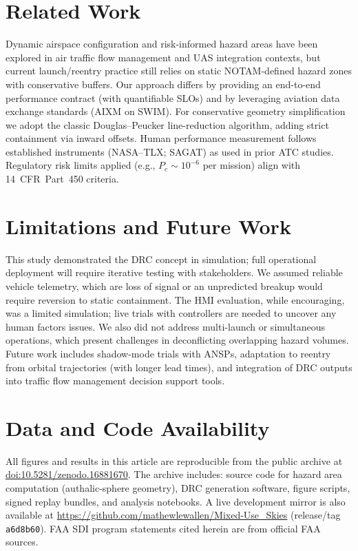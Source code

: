 \documentclass[journal]{new-aiaa}
\newcommand{\DRC}{\textsc{DRC}}
\newcommand{\AIXM}{\textsc{AIXM}}
\newcommand{\SWIM}{\textsc{SWIM}}
\newcommand{\repoURL}{https://github.com/mathewlewallen/Mixed-Use_Skies}
\newcommand{\repoCommit}{a6d8b60}
\newcommand{\repoDOI}{10.5281/zenodo.16881670}
\begin{document}
\section{Related Work}
Dynamic airspace configuration and risk-informed hazard areas have been explored in air traffic flow management and UAS integration contexts, but current launch/reentry practice still relies on static NOTAM-defined hazard zones with conservative buffers.\cite{CRS2019} Our approach differs by providing an end-to-end performance contract (with quantifiable SLOs) and by leveraging aviation data exchange standards (\AIXM{} on \SWIM{}). For conservative geometry simplification we adopt the classic Douglas–Peucker line-reduction algorithm,\cite{DouglasPeucker} adding strict containment via inward offsets. Human performance measurement follows established instruments (NASA--TLX; SAGAT) as used in prior ATC studies.\cite{NASA_TLX,Endsley_SAGAT} Regulatory risk limits applied (e.g., $P_c\sim10^{-6}$ per mission) align with 14~CFR~Part~450 criteria.\cite{CFR450}

\section{Limitations and Future Work}
This study demonstrated the \DRC{} concept in simulation; full operational deployment will require iterative testing with stakeholders. We assumed reliable vehicle telemetry, which are loss of signal or an unpredicted breakup would require reversion to static containment. The HMI evaluation, while encouraging, was a limited simulation; live trials with controllers are needed to uncover any human factors issues. We also did not address multi-launch or simultaneous operations, which present challenges in deconflicting overlapping hazard volumes. Future work includes shadow-mode trials with ANSPs, adaptation to reentry from orbital trajectories (with longer lead times), and integration of \DRC{} outputs into traffic flow management decision support tools.

\section*{Data and Code Availability}
All figures and results in this article are reproducible from the public archive at \href{https://doi.org/\repoDOI}{doi:\repoDOI}. The archive includes: source code for hazard area computation (authalic-sphere geometry), \DRC{} generation software, figure scripts, signed replay bundles, and analysis notebooks. A live development mirror is also available at \url{\repoURL} (release/tag \texttt{\repoCommit}). FAA SDI program statements cited herein are from official FAA sources.\cite{FAA_SDI_2021,FAA_SDI_2024}
\end{document}
